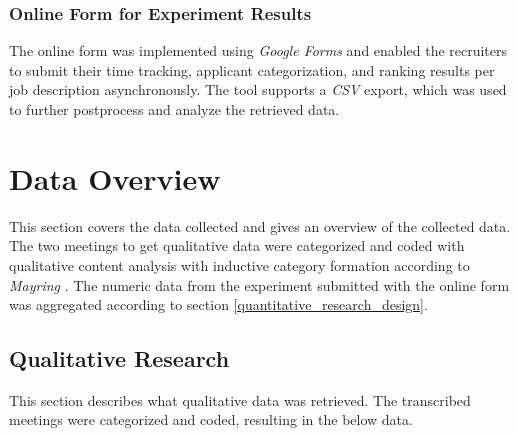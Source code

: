 \documentclass[draft,final]{thesisclass} %
\begin{document}
\subsubsection{Online Form for Experiment Results}
The online form was implemented using \textit{Google Forms} and enabled the recruiters to submit their time tracking, applicant categorization, and ranking results per job description asynchronously. The tool supports a \textit{CSV} export, which was used to further postprocess and analyze the retrieved data.

\section{Data Overview}
This section covers the data collected and gives an overview of the collected data.
The two meetings to get qualitative data were categorized and coded with qualitative content analysis with inductive category formation according to \textit{Mayring} \parencite{mayring}.
The numeric data from the experiment submitted with the online form was aggregated according to section \ref{quantitative_research_design}.

\subsection{Qualitative Research}
This section describes what qualitative data was retrieved.
The transcribed meetings were categorized and coded, resulting in the below data.
\end{document}
